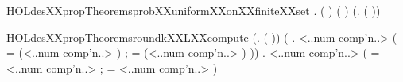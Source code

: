 \begin{SaveVerbatim}{HOLdesXXpropTheoremsprobXXuniformXXonXXfiniteXXset}
\HOLTokenTurnstile{} \HOLSymConst{\HOLTokenForall{}}.  ( ) \HOLSymConst{\HOLTokenConj{}}   \HOLSymConst{\HOLTokenNotEqual{}} \HOLTokenLeftbrace{}\HOLTokenRightbrace{} \HOLSymConst{\HOLTokenConj{}}
         \HOLSymConst{=}  ( ) \HOLSymConst{\HOLTokenConj{}}
       (\HOLSymConst{\HOLTokenForall{}}.  \HOLConst{\HOLTokenIn{}}   \HOLSymConst{\HOLTokenImp{}}
               \HOLSymConst{=} \HOLSymConst{\&}  \HOLSymConst{/} \HOLSymConst{\&} ( )) \HOLSymConst{\HOLTokenImp{}}
        
\end{SaveVerbatim}
\newcommand{\HOLdesXXpropTheoremsprobXXuniformXXonXXfiniteXXset}{\UseVerbatim{HOLdesXXpropTheoremsprobXXuniformXXonXXfiniteXXset}}
\begin{SaveVerbatim}{HOLdesXXpropTheoremsroundkXXLXXcompute}
\HOLTokenTurnstile{} (\HOLSymConst{\HOLTokenForall{}}.    \HOLSymConst{=}  ( )) \HOLSymConst{\HOLTokenConj{}}
   (\HOLSymConst{\HOLTokenForall{}} .
       <..num comp'n..>  \HOLSymConst{=}
      (
          =  (<..num comp'n..> \HOLSymConst{\ensuremath{-}} ) ;
          =  (<..num comp'n..> \HOLSymConst{\ensuremath{-}} ) 
          \HOLSymConst{\HOLTokenRol{}} )) \HOLSymConst{\HOLTokenConj{}}
   \HOLSymConst{\HOLTokenForall{}} .
      <..num comp'n..>  \HOLSymConst{=}
     (
         =  <..num comp'n..> ;
         =  <..num comp'n..> 
         \HOLSymConst{\HOLTokenRol{}} )
\end{SaveVerbatim}
\newcommand{\HOLdesXXpropTheoremsroundkXXLXXcompute}{\UseVerbatim{HOLdesXXpropTheoremsroundkXXLXXcompute}}
